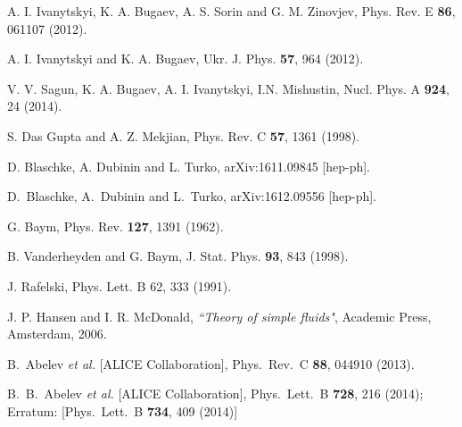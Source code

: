 \documentclass[12pt]{article}
\begin{document}
\begin{thebibliography}{99}
%
A. I. Ivanytskyi, K. A. Bugaev, A. S. Sorin and G. M. Zinovjev, Phys. Rev. E {\bf 86}, 061107  (2012).
 
%
A. I. Ivanytskyi and K. A. Bugaev,
Ukr. J. Phys.  {\bf 57},  964 (2012).

  
V. V. Sagun, K. A. Bugaev, A. I. Ivanytskyi, I.N. Mishustin,
Nucl. Phys. A {\bf 924}, 24 (2014).

S. Das Gupta and A. Z. Mekjian, 
Phys. Rev. C {\bf 57}, 1361 (1998).  


D. Blaschke, A. Dubinin and L. Turko, arXiv:1611.09845 [hep-ph].

D.~Blaschke, A.~Dubinin and L.~Turko,
  arXiv:1612.09556 [hep-ph].

% 
G. Baym, Phys. Rev. {\bf 127}, 1391 (1962).

% 
B. Vanderheyden and  G. Baym, J. Stat. Phys.  {\bf  93}, 843 (1998).


 J. Rafelski, Phys. Lett. B 62, 333 (1991).

 
%
J. P. Hansen and I. R. McDonald,  {\it ``Theory of simple fluids"}, Academic Press, Amsterdam, 2006.

  B.~Abelev {\it et al.} [ALICE Collaboration],
  Phys.\ Rev.\ C {\bf 88}, 044910 (2013).

  B.~B.~Abelev {\it et al.} [ALICE Collaboration],
  Phys.\ Lett.\ B {\bf 728}, 216 (2014);
  Erratum: [Phys.\ Lett.\ B {\bf 734}, 409 (2014)]


\end{thebibliography}
\end{document}
